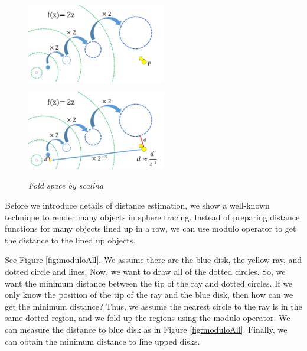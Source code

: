 \begin{figure}[htbp]
 \begin{minipage}[t]{0.5\hsize}
  \center
  \includegraphics[height=1.35in, keepaspectratio]{img/visualization/scaling1.png}
  \subcaption{\textit{}}
  \label{fig:iisScale1}
  \hspace*{\fill}
 \end{minipage}
 \begin{minipage}[t]{0.5\hsize}
  \center
  \includegraphics[height=1.35in, keepaspectratio]{img/visualization/scaling2.png}
  \subcaption{\textit{}}
  \label{fig:iisScale2}
  \hspace*{\fill}
 \end{minipage}
 \caption{\textit{Fold space by scaling}}
 \label{fig:iisScaleAll}
\end{figure}

Before we introduce details of distance estimation, we show
a well-known technique to render many objects in sphere tracing.
Instead of preparing distance functions for many objects lined up in a
row, we can use modulo operator
to get the distance to the lined up objects.

See Figure \ref{fig:moduloAll}. 
We assume there are the blue disk, the
yellow ray, and dotted circle and lines.
Now, we want to draw all of the dotted circles.
So, we want the minimum distance between the tip of the ray and dotted circles.
If we only know the position of the tip of the ray and the blue disk,
then
how can we get the minimum distance?
Thus, we assume the nearest circle to the ray is in the same dotted region, and
we fold up the regions using the modulo operator.
We can measure the distance to blue disk as in Figure \ref{fig:moduloAll}.
Finally, we can obtain the minimum distance to line upped disks.

